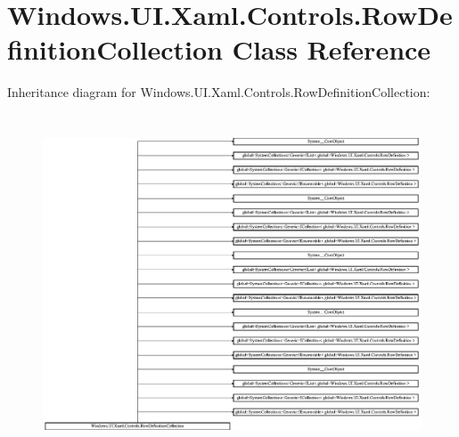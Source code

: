 \hypertarget{class_windows_1_1_u_i_1_1_xaml_1_1_controls_1_1_row_definition_collection}{}\section{Windows.\+U\+I.\+Xaml.\+Controls.\+Row\+Definition\+Collection Class Reference}
\label{class_windows_1_1_u_i_1_1_xaml_1_1_controls_1_1_row_definition_collection}
Inheritance diagram for Windows.\+U\+I.\+Xaml.\+Controls.\+Row\+Definition\+Collection\+:\begin{figure}[H]
\begin{center}
\leavevmode
\includegraphics[height=10.103093cm]{class_windows_1_1_u_i_1_1_xaml_1_1_controls_1_1_row_definition_collection}
\end{center}
\end{figure}
